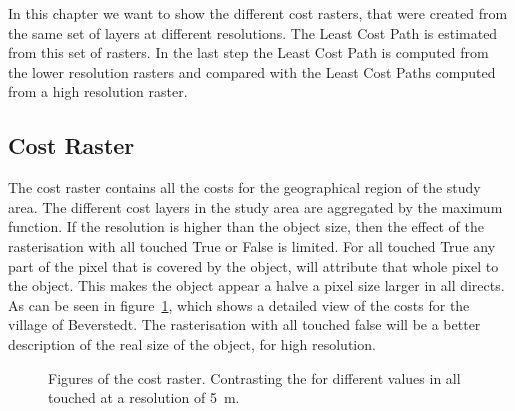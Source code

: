 
In this chapter we want to show the different cost rasters, that were created from the same set of layers at different resolutions.
The Least Cost Path is estimated from this set of rasters.
In the last step the Least Cost Path is computed from the lower resolution rasters and compared with the Least Cost Paths computed from a high resolution raster.

\subsection{Cost Raster}\label{subsec:cost-raster}

The cost raster contains all the costs for the geographical region of the study area.
The different cost layers in the study area are aggregated by the maximum function.
If the resolution is higher than the object size, then the effect of the rasterisation with all touched True or False is limited.
For all touched True any part of the pixel that is covered by the object, will attribute that whole pixel to the object.
This makes the object appear a halve a pixel size larger in all directs.
As can be seen in figure~\ref{fig:costs_5m}, which shows a detailed view of the costs for the village of Beverstedt.
The rasterisation with all touched false will be a better description of the real size of the object, for high resolution.
\begin{figure}
	\centering

	\qquad
	\caption{Figures of the cost raster. Contrasting the for different values in all touched at a resolution of 5~m.}
	\label{fig:costs_5m}
\end{figure}

